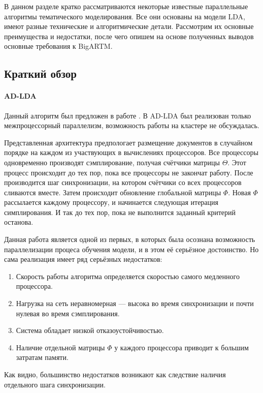 
В данном разделе кратко рассматриваются некоторые известные параллельные алгоритмы тематического моделирования. Все они основаны на модели LDA, имеют разные технические и алгоритмические детали. Рассмотрим их основные преимущества и недостатки, после чего опишем на основе полученных выводов основные требования к BigARTM. 

\subsection{Краткий обзор}

\paragraph{AD-LDA}
Данный алгоритм был предложен в работе \cite{ad_lda}. В AD-LDA был реализован только межпроцессорный параллелизм, возможность работы на кластере не обсуждалась. 

Представленная архитектура предпологает размещение документов в случайном порядке на каждом из участвующих в вычислениях процессоров. Все процессоры одновременно производят сэмплирование, получая счётчики матрицы $\Theta$. Этот процесс происходит до тех пор, пока все процессоры не закончат работу. После производится шаг синхронизации, на котором счётчики со всех процессоров сливаются вместе. Затем происходит обновление глобальной матрицы $\Phi$. Новая $\Phi$ рассылается каждому процессору, и начинается следующая итерация симплирования. И так до тех пор, пока не выполнится заданный критерий останова.

Данная работа является одной из первых, в которых была осознана возможность параллелизации процеса обучения модели, и в этом её серьёзное достоинство. Но сама реализация имеет ряд серьёзных недостатков:

\begin{enumerate}
	\item Скорость работы алгоритма определяется скоростью самого медленного процессора.
	\item Нагрузка на сеть неравномерная --- высока во время синхронизации и почти нулевая во время сэмплирования. 
	\item Система обладает низкой отказоустойчивостью.
	\item Наличие отдельной матрицы $\Phi$ у каждого процессора приводит к большим затратам памяти.
\end{enumerate}

Как видно, большинство недостатков возникают как следствие наличия отдельного шага синхронизации.

